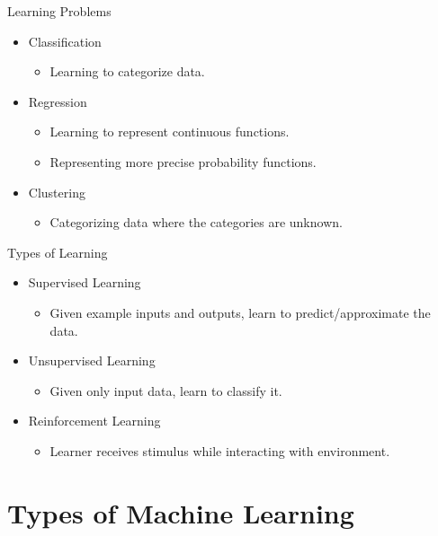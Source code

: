 \documentclass[11pt]{beamer}
\begin{document}
\begin{frame}{Learning Problems}
\begin{itemize}
    \item Classification
    \begin{itemize}
        \item Learning to categorize data.
    \end{itemize}

    \item Regression
    \begin{itemize}
        \item Learning to represent continuous functions.
        \item Representing more precise probability functions.
    \end{itemize}

    \item Clustering
    \begin{itemize}
        \item Categorizing data where the categories are unknown.
    \end{itemize}
\end{itemize}
\end{frame}

\begin{frame}{Types of Learning}
\begin{itemize}
    \item Supervised Learning
    \begin{itemize}
        \item Given example inputs and outputs, learn to predict/approximate the data.
    \end{itemize}
    \item Unsupervised Learning
    \begin{itemize}
        \item Given only input data, learn to classify it.
    \end{itemize}
    \item Reinforcement Learning
    \begin{itemize}
        \item Learner receives stimulus while interacting with environment.
    \end{itemize}
\end{itemize}
\end{frame}

\section{Types of Machine Learning}
\end{document}
